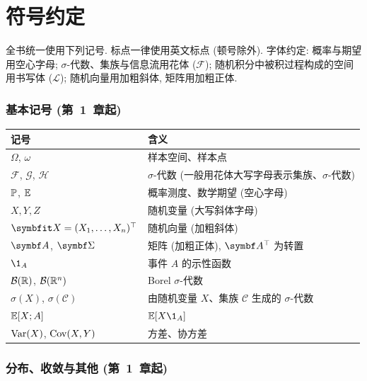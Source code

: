 \chapter*{符号约定}

全书统一使用下列记号. 标点一律使用英文标点 (顿号除外). 字体约定: 概率与期望用空心字母; $\sigma$-代数、集族与信息流用花体 ($\mathcal{F}$); 随机积分中被积过程构成的空间用书写体 ($\mathscr{L}$); 随机向量用加粗斜体, 矩阵用加粗正体.

\subsection*{基本记号 (第~1~章起)}

\begin{center}
\small\renewcommand{\arraystretch}{1.1}
\begin{tabular}{>{\raggedright\arraybackslash}p{} >{\raggedright\arraybackslash}p{}}
\toprule
\textbf{记号} & \textbf{含义} \\
\midrule
$\Omega$, $\omega$ & 样本空间、样本点 \\
$\mathcal{F}$, $\mathcal{G}$, $\mathcal{H}$ & $\sigma$-代数 (一般用花体大写字母表示集族、$\sigma$-代数) \\
$\P$, $\E$ & 概率测度、数学期望 (空心字母) \\
$X, Y, Z$ & 随机变量 (大写斜体字母) \\
$\rvec{X} = (X_1,\dots,X_n)^\T$ & 随机向量 (加粗斜体) \\
$\mat{A}$, $\mat{\Sigma}$ & 矩阵 (加粗正体), $\mat{A}^\T$ 为转置 \\
$\1_A$ & 事件 $A$ 的示性函数 \\
$\mathcal{B}(\R)$, $\mathcal{B}(\R^n)$ & Borel $\sigma$-代数 \\
$\sigma(X)$, $\sigma(\mathcal{C})$ & 由随机变量 $X$、集族 $\mathcal{C}$ 生成的 $\sigma$-代数 \\
$\E[X;A]$ & $\E[X\1_A]$ \\
$\Var(X)$, $\Cov(X,Y)$ & 方差、协方差 \\
\bottomrule
\end{tabular}
\end{center}

\subsection*{分布、收敛与其他 (第~1~章起)}

